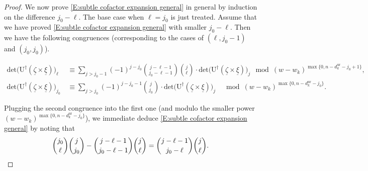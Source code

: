 \documentclass[12pt]{amsart}
\theoremstyle{definition}
\numberwithin{equation}{subsection}
\def\rmU{\mathrm{U}}
\renewcommand{\det}{\mathrm{det}}
\newcommand{\ur}{\mathrm{ur}}
\begin{document}
\begin{proof}
We now prove \eqref{E:subtle cofactor expansion general} in general by induction on the difference $j_0-\ell$. The base case when $\ell=j_0$ is just treated. Assume that we have proved \eqref{E:subtle cofactor expansion general} with smaller $j_0-\ell$. Then we have the following congruences (corresponding to the cases of $(\ell, j_0-1)$ and $(j_0, j_0)$).
\begin{small}
\begin{align*}
\det \big(\rmU^\dagger(\underline \zeta \times \underline \xi)\big)_{\ell} &\,\equiv \sum_{j > j_0-1} 
(-1)^{j-j_0} \binom{j-\ell-1}{j_0-\ell-1}\binom {j}{\ell}\cdot \det 
\big(\rmU^\dagger(\underline \zeta \times \underline \xi)\big)_j \ \bmod 
(w-w_k)^{\max\{0,n-d_k^\ur-j_0+1\}},
\\
\det \big(\rmU^\dagger(\underline \zeta \times \underline \xi)\big)_{j_0} &\,\equiv  \sum_{j > j_0} (-1)^{j-j_0-1} \binom{j}{j_0}\cdot \det \big(\rmU^\dagger(\underline \zeta \times \underline \xi)\big)_j \quad \bmod (w-w_k)^{\max\{0,n-d_k^\ur-j_0\}}.
\end{align*}
\end{small}
Plugging the second congruence into the first one (and modulo the smaller power $(w-w_k)^{\max\{0,n-d_k^\ur-j_0\}}$), we immediate deduce \eqref{E:subtle cofactor expansion general} by noting that
\[
\binom{j_0}{\ell} \binom{j}{j_0}-\binom{j-\ell-1}{j_0-\ell-1}\binom{j}{\ell}
= \binom{j-\ell-1}{j_0-\ell} \binom{j}{\ell}.\qedhere
\]
\end{proof}
\end{document}
